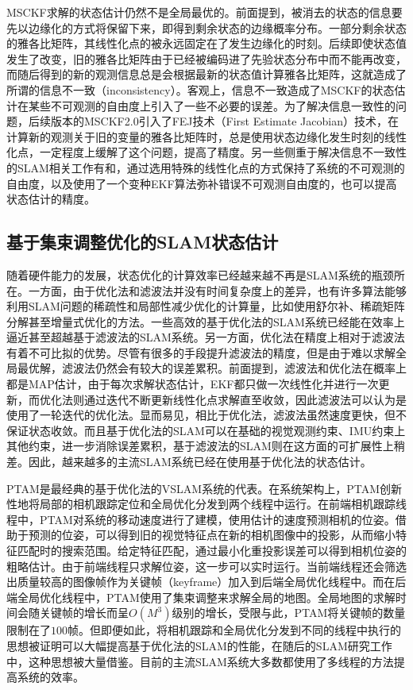 MSCKF求解的状态估计仍然不是全局最优的。前面提到，被消去的状态的信息要先以边缘化的方式将保留下来，即得到剩余状态的边缘概率分布。一部分剩余状态的雅各比矩阵，其线性化点的被永远固定在了发生边缘化的时刻。后续即使状态值发生了改变，旧的雅各比矩阵由于已经被编码进了先验状态分布中而不能再改变，而随后得到的新的观测信息总是会根据最新的状态值计算雅各比矩阵，这就造成了所谓的信息不一致（inconsistency）。客观上，信息不一致造成了MSCKF的状态估计在某些不可观测的自由度上引入了一些不必要的误差。为了解决信息一致性的问题，后续版本的MSCKF2.0\citep{li2012improving}引入了FEJ技术（First Estimate Jacobian）技术\citep{huang2008analysis}，在计算新的观测关于旧的变量的雅各比矩阵时，总是使用状态边缘化发生时刻的线性化点，一定程度上缓解了这个问题，提高了精度。另一些侧重于解决信息不一致性的SLAM相关工作有\citep{huang2011observability}和\citep{huang2013quadratic}，通过选用特殊的线性化点的方式保持了系统的不可观测的自由度，以及使用了一个变种EKF算法弥补错误不可观测自由度的\citep{barrau2015ekf}，也可以提高状态估计的精度。

\subsection{基于集束调整优化的SLAM状态估计}

随着硬件能力的发展，状态优化的计算效率已经越来越不再是SLAM系统的瓶颈所在。一方面，由于优化法和滤波法并没有时间复杂度上的差异，也有许多算法能够利用SLAM问题的稀疏性和局部性减少优化的计算量，比如使用舒尔补、稀疏矩阵分解甚至增量式优化的方法。一些高效的基于优化法的SLAM系统已经能在效率上逼近甚至超越基于滤波法的SLAM系统。另一方面，优化法在精度上相对于滤波法有着不可比拟的优势。尽管有很多的手段提升滤波法的精度，但是由于难以求解全局最优解，滤波法仍然会有较大的误差累积。前面提到，滤波法和优化法在概率上都是MAP估计，由于每次求解状态估计，EKF都只做一次线性化并进行一次更新，而优化法则通过迭代不断更新线性化点求解直至收敛，因此滤波法可以认为是使用了一轮迭代的优化法。显而易见，相比于优化法，滤波法虽然速度更快，但不保证状态收敛。而且基于优化法的SLAM可以在基础的视觉观测约束、IMU约束上其他约束，进一步消除误差累积，基于滤波法的SLAM则在这方面的可扩展性上稍差。因此，越来越多的主流SLAM系统已经在使用基于优化法的状态估计。

PTAM\citep{klein2007parallel}是最经典的基于优化法的VSLAM系统的代表。在系统架构上，PTAM创新性地将局部的相机跟踪定位和全局优化分发到两个线程中运行。在前端相机跟踪线程中，PTAM对系统的移动速度进行了建模，使用估计的速度预测相机的位姿。借助于预测的位姿，可以得到旧的视觉特征点在新的相机图像中的投影，从而缩小特征匹配时的搜索范围。给定特征匹配，通过最小化重投影误差可以得到相机位姿的粗略估计。由于前端线程只求解位姿，这一步可以实时运行。当前端线程还会筛选出质量较高的图像帧作为关键帧（keyframe）加入到后端全局优化线程中。而在后端全局优化线程中，PTAM使用了集束调整来求解全局的地图。全局地图的求解时间会随关键帧的增长而呈$O(M^3)$级别的增长，受限与此，PTAM将关键帧的数量限制在了$100$帧。但即便如此，将相机跟踪和全局优化分发到不同的线程中执行的思想被证明可以大幅提高基于优化法的SLAM的性能，在随后的SLAM研究工作中，这种思想被大量借鉴。目前的主流SLAM系统大多数都使用了多线程的方法提高系统的效率。

